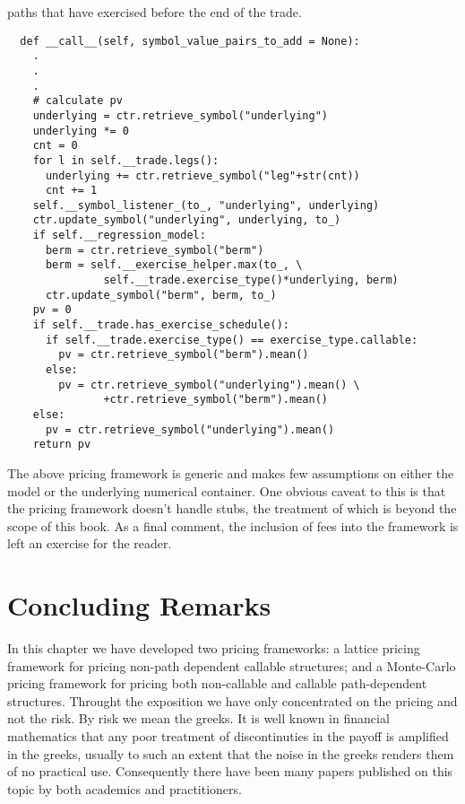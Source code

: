 paths that have exercised before the end of the trade.
\begin{verbatim}      
  def __call__(self, symbol_value_pairs_to_add = None):
    .
    .
    .
    # calculate pv
    underlying = ctr.retrieve_symbol("underlying")
    underlying *= 0
    cnt = 0
    for l in self.__trade.legs():
      underlying += ctr.retrieve_symbol("leg"+str(cnt))         
      cnt += 1
    self.__symbol_listener_(to_, "underlying", underlying)
    ctr.update_symbol("underlying", underlying, to_)
    if self.__regression_model:
      berm = ctr.retrieve_symbol("berm")
      berm = self.__exercise_helper.max(to_, \
               self.__trade.exercise_type()*underlying, berm)
      ctr.update_symbol("berm", berm, to_)
    pv = 0
    if self.__trade.has_exercise_schedule():
      if self.__trade.exercise_type() == exercise_type.callable:
        pv = ctr.retrieve_symbol("berm").mean()
      else:
        pv = ctr.retrieve_symbol("underlying").mean() \
               +ctr.retrieve_symbol("berm").mean()
    else:
      pv = ctr.retrieve_symbol("underlying").mean()
    return pv
\end{verbatim}

The above pricing framework is generic and makes few assumptions on
either the model or the underlying numerical container. One obvious
caveat to this is that the pricing framework doesn't handle stubs, the
treatment of which is beyond the scope of this book. As a final
comment, the inclusion of fees into the framework is left an exercise
for the reader.

\section{Concluding Remarks}
In this chapter we have developed two pricing frameworks: a lattice
pricing framework for pricing non-path dependent callable structures;
and a Monte-Carlo pricing framework for pricing both non-callable and
callable path-dependent structures. Throught the exposition we have
only concentrated on the pricing and not the risk. By risk we mean the
greeks. It is well known in financial mathematics that any poor
treatment of discontinuties in the payoff is amplified in the greeks,
usually to such an extent that the noise in the greeks renders them of
no practical use. Consequently there have been many papers published on
this topic by both academics and practitioners.

